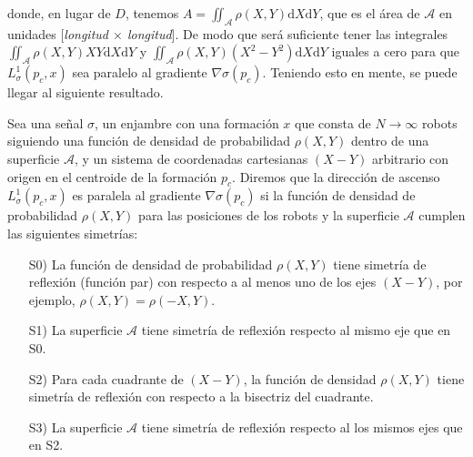 donde, en lugar de $D$, tenemos $A = \iint_{\mathcal{A}} \rho(X,Y) \mathrm{d}X\mathrm{d}Y$, que es el área de $\mathcal{A}$ en unidades [\emph{longitud $\times$ longitud}]. De modo que será suficiente tener las integrales $\iint_\mathcal{A} \rho(X,Y)XY \mathrm{d}X\mathrm{d}Y$ y $\iint_\mathcal{A} \rho(X,Y)(X^2 - Y^2) \mathrm{d}X\mathrm{d}Y$ iguales a cero para que $L^1_\sigma(p_c,x)$ sea paralelo al gradiente $\nabla\sigma(p_c)$. Teniendo esto en mente, se puede llegar al siguiente resultado.

\vspace{0.2cm}

\begin{prop} \label{pro: U}
Sea una señal $\sigma$, un enjambre con una formación $x$ que consta de $N\to\infty$ robots siguiendo una función de densidad de probabilidad $\rho(X,Y)$ dentro de una superficie $\mathcal{A}$, y un sistema de coordenadas cartesianas $(X-Y)$ arbitrario con origen en el centroide de la formación $p_c$. Diremos que la dirección de ascenso $L_\sigma^1(p_c, x)$ es paralela al gradiente $\nabla\sigma(p_c)$ si la función de densidad de probabilidad $\rho(X,Y)$ para las posiciones de los robots y la superficie $\mathcal{A}$ cumplen las siguientes simetrías:
\begin{enumerate}
\item[S0)] La función de densidad de probabilidad $\rho(X,Y)$ tiene simetría de reflexión (función par) con respecto a al menos uno de los ejes $(X-Y)$, por ejemplo, $\rho(X,Y) = \rho(-X,Y)$.
\item[S1)] La superficie $\mathcal{A}$ tiene simetría de reflexión respecto al mismo eje que en S0.
\item[S2)] Para cada cuadrante de $(X-Y)$, la función de densidad $\rho(X,Y)$ tiene simetría de reflexión con respecto a la bisectriz del cuadrante.
\item[S3)] La superficie $\mathcal{A}$ tiene simetría de reflexión respecto al los mismos ejes que en S2.
\end{enumerate}
\end{prop}

